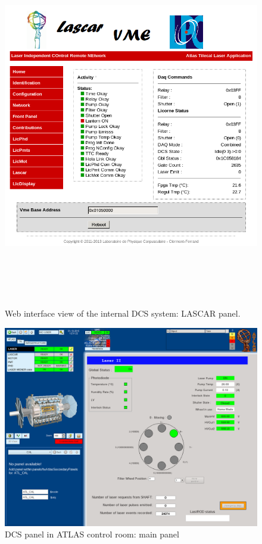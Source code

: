 \begin{appendices}
\begin{figure}[htbp]
\centering
\includegraphics[height=16cm]{figures/licorne_web4.png}
\caption{Web interface view of the internal DCS system:  LASCAR panel.}\label{fig:licorne_webb}
\end{figure}



\newpage

\begin{figure}[htbp]
\centering
\includegraphics[width=16cm]{figures/dcs_cr_filterwheel.png}
\caption{DCS panel in ATLAS control room: main panel}\label{fig:dcs_cr_a}
\end{figure}


\end{appendices}
